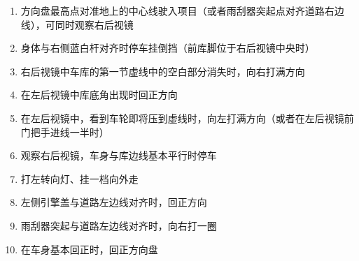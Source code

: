 \begin{enumerate}
    \item 方向盘最高点对准地上的中心线驶入项目（或者雨刮器突起点对齐道路右边线），可同时观察右后视镜
    \item 身体与右侧蓝白杆对齐时停车挂倒挡（前库脚位于右后视镜中央时）
    \item 右后视镜中车库的第一节虚线中的空白部分消失时，向右打满方向
    \item 在左后视镜中库底角出现时回正方向
    \item 在左后视镜中，看到车轮即将压到虚线时，向左打满方向（或者在左后视镜前门把手进线一半时）
    \item 观察右后视镜，车身与库边线基本平行时停车
    \item 打左转向灯、挂一档向外走
    \item 左侧引擎盖与道路左边线对齐时，回正方向
    \item 雨刮器突起与道路左边线对齐时，向右打一圈
    \item 在车身基本回正时，回正方向盘
\end{enumerate}